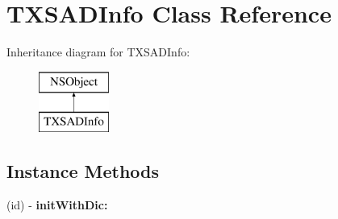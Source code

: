 \hypertarget{interface_t_x_s_a_d_info}{}\section{T\+X\+S\+A\+D\+Info Class Reference}
\label{interface_t_x_s_a_d_info}
Inheritance diagram for T\+X\+S\+A\+D\+Info\+:\begin{figure}[H]
\begin{center}
\leavevmode
\includegraphics[height=2.000000cm]{interface_t_x_s_a_d_info}
\end{center}
\end{figure}
\subsection*{Instance Methods}
\begin{DoxyCompactItemize}
\item 
\hypertarget{interface_t_x_s_a_d_info_adff014e1355748db80cc6b3f2c81f752}{}(id) -\/ {\bfseries init\+With\+Dic\+:}\label{interface_t_x_s_a_d_info_adff014e1355748db80cc6b3f2c81f752}

\end{DoxyCompactItemize}
